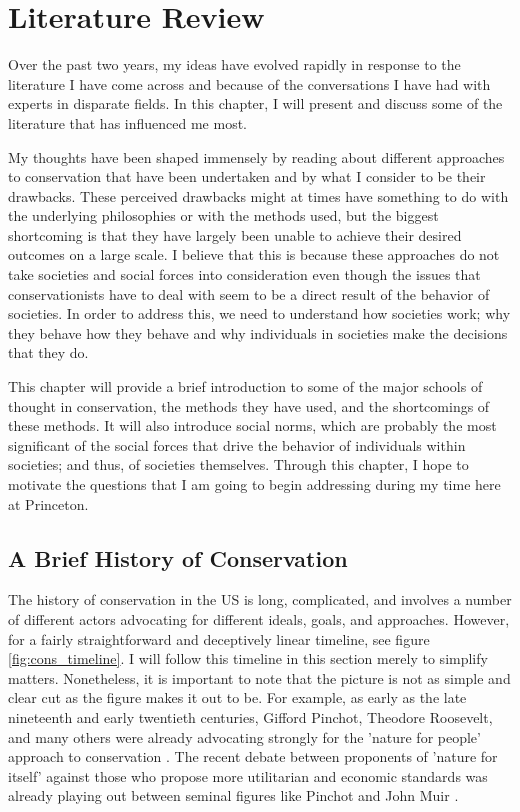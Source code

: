 \documentclass[rutwik_proposal.tex]{subfiles}
\begin{document}
\chapter{Literature Review}\label{ch:litrev}

Over the past two years, my ideas have evolved rapidly in response to the literature I have come across and because of the conversations I have had with experts in disparate fields. In this chapter, I will present and discuss some of the literature that has influenced me most.

My thoughts have been shaped immensely by reading about different approaches to conservation that have been undertaken and by what I consider to be their drawbacks. These perceived drawbacks might at times have something to do with the underlying philosophies or with the methods used, but the biggest shortcoming is that they have largely been unable to achieve their desired outcomes on a large scale. I believe that this is because these approaches do not take societies and social forces into consideration even though the issues that conservationists have to deal with seem to be a direct result of the behavior of societies. In order to address this, we need to understand how societies work; why they behave how they behave and why individuals in societies make the decisions that they do.

This chapter will provide a brief introduction to some of the major schools of thought in conservation, the methods they have used, and the shortcomings of these methods. It will also introduce social norms, which are probably the most significant of the social forces that drive the behavior of individuals within societies; and thus, of societies themselves. Through this chapter, I hope to motivate the questions that I am going to begin addressing during my time here at Princeton.

\section{A Brief History of Conservation}\label{sec:history}

The history of conservation in the US is long, complicated, and involves a number of different actors advocating for different ideals, goals, and approaches. However, for a fairly straightforward and deceptively linear timeline, see figure \ref{fig:cons_timeline}. I will follow this timeline in this section merely to simplify matters. Nonetheless, it is important to note that the picture is not as simple and clear cut as the figure makes it out to be. For example, as early as the late nineteenth and early twentieth centuries, Gifford Pinchot, Theodore Roosevelt, and many others were already advocating strongly for the 'nature for people' approach to conservation \cite{Pinchot98, Pinchot10, Brinkley09}. The recent debate between proponents of 'nature for itself' against those who propose more utilitarian and economic standards was already playing out between seminal figures like Pinchot and John Muir \cite{Righter05}.
\end{document}

